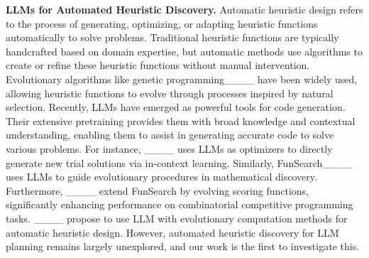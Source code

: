 
\textbf{LLMs for Automated Heuristic Discovery.} 
Automatic heuristic design refers to the process of generating, optimizing, or adapting heuristic functions automatically to solve problems. Traditional heuristic functions are typically handcrafted based on domain expertise, but automatic methods use algorithms to create or refine these heuristic functions without manual intervention. Evolutionary algorithms like genetic programming____ have been widely used, allowing heuristic functions to evolve through processes inspired by natural selection. Recently, LLMs have emerged as powerful tools for code generation. Their extensive pretraining provides them with broad knowledge and contextual understanding, enabling them to assist in generating accurate code to solve various problems. For instance, ____ uses LLMs as optimizers to directly generate new trial solutions via in-context learning. Similarly, FunSearch____ uses LLMs to guide evolutionary procedures in mathematical discovery. Furthermore, ____ extend FunSearch by evolving scoring functions, significantly enhancing performance on combinatorial competitive programming tasks. ____ propose to use LLM with evolutionary computation methods for automatic heuristic design. However, automated heuristic discovery for LLM planning remains largely unexplored, and our work is the first to investigate this.

